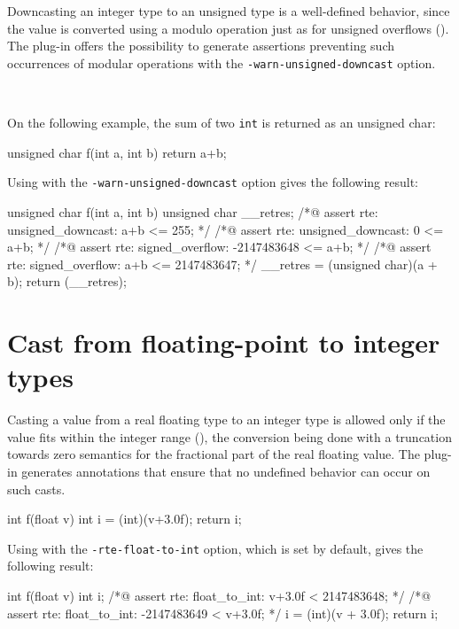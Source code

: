 Downcasting an integer type to an unsigned type is a well-defined behavior,
since the value is converted using a modulo operation just as for unsigned
overflows (). The \rte{} plug-in offers the
possibility to generate assertions preventing such occurrences of modular
operations with the \lstinline|-warn-unsigned-downcast| option.

\begin{example} ~

On the following example, the sum of two \lstinline|int| is returned as an
unsigned char:

\begin{listing-nonumber}
unsigned char f(int a, int b) {
  return a+b;
}
\end{listing-nonumber}

Using \rte{} with the \lstinline|-warn-unsigned-downcast| option gives the
following result:
\begin{listing-nonumber}
unsigned char f(int a, int b) {
  unsigned char __retres;
  /*@ assert rte: unsigned_downcast: a+b <= 255; */
  /*@ assert rte: unsigned_downcast: 0 <= a+b; */
  /*@ assert rte: signed_overflow: -2147483648 <= a+b; */
  /*@ assert rte: signed_overflow: a+b <= 2147483647; */
  __retres = (unsigned char)(a + b);
  return (__retres);
}
\end{listing-nonumber}


\end{example}

\section{Cast from floating-point to integer types}

Casting a value from a real floating type to an integer type is
allowed only if the value fits within the integer range (),
the conversion being done with a truncation
towards zero semantics for the fractional part of the real floating
value.  The \rte{} plug-in generates annotations that ensure that no
undefined behavior can occur on such casts.

\begin{listing-nonumber}
int f(float v) {
  int i = (int)(v+3.0f);
  return i;
}
\end{listing-nonumber}

Using \rte{} with the \lstinline|-rte-float-to-int| option, which is set
by default, gives the following result:
\begin{listing-nonumber}
int f(float v) {
  int i;
  /*@ assert rte: float_to_int: v+3.0f < 2147483648; */
  /*@ assert rte: float_to_int: -2147483649 < v+3.0f; */
  i = (int)(v + 3.0f);
  return i;
}
\end{listing-nonumber}


